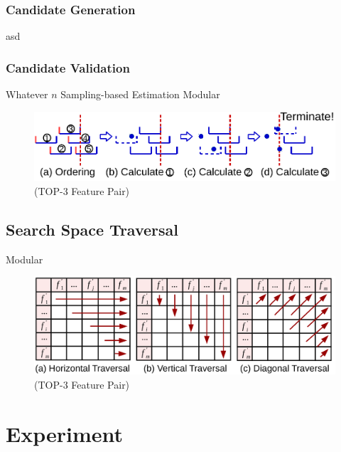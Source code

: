 \subsubsection{Candidate Generation}
asd
\subsubsection{Candidate Validation}

  Whatever $n$
Sampling-based Estimation
\sampling Modular
\begin{figure}[h]
  \centering
  \vspace{-4mm}
  \includegraphics[width=\linewidth]{fig/candidate_ordering.pdf}
  \vspace{-6mm}
\caption{\sampling (TOP-3 Feature Pair)}
\label{fig:sampling}
\end{figure} 

\begin{example}
\end{example}

\subsection{Search Space Traversal} \label{ssec:traversal}
\traversal Modular

\begin{figure}[h]
  \centering
  \includegraphics[width=\linewidth]{fig/traversal.pdf}
  \vspace{-6mm}
\caption{\sampling (TOP-3 Feature Pair)}
\label{fig:sampling}
\end{figure} 



\begin{example}
\end{example}
\section{Experiment}
\label{sec:exp}








